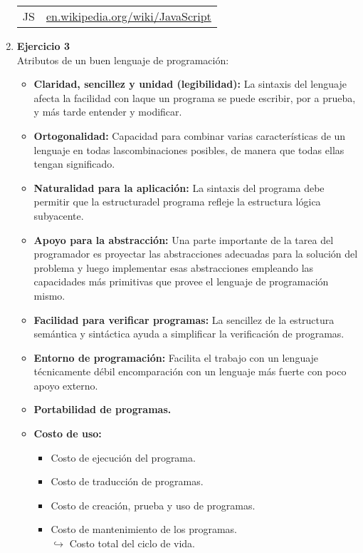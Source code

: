 \documentclass[a4paper,10pt]{article}
\begin{document}
\begin{enumerate}
\begin{tabular}{r|l}
            \textsc{JS}
                & \href{https://en.wikipedia.org/wiki/JavaScript}{en.wikipedia.org/wiki/JavaScript} \\ 
        \end{tabular}
    
        \item \textbf{Ejercicio 3} \\ 
        Atributos de un buen lenguaje de programación:
            \begin{itemize}
                \item \textbf{Claridad, sencillez y unidad (legibilidad):} La sintaxis del lenguaje afecta la facilidad con laque un programa se puede escribir, por a prueba, y más tarde entender y modificar.
                \item \textbf{Ortogonalidad:} Capacidad para combinar varias características de un lenguaje en todas lascombinaciones posibles, de manera que todas ellas tengan significado.
                \item \textbf{Naturalidad para la aplicación:} La sintaxis del programa debe permitir que la estructuradel programa refleje la estructura lógica subyacente.
                \item \textbf{Apoyo para la abstracción:} Una parte importante de la tarea del programador es proyectar las abstracciones adecuadas para la solución del problema y luego implementar esas abstracciones empleando las capacidades más primitivas que provee el lenguaje de programación mismo.
                \item \textbf{Facilidad para verificar programas:} La sencillez de la estructura semántica y sintáctica ayuda a simplificar la verificación de programas.
                \item \textbf{Entorno de programación:} Facilita el trabajo con un lenguaje técnicamente débil encomparación con un lenguaje más fuerte con poco apoyo externo.
                \item \textbf{Portabilidad de programas.}
                \item \textbf{Costo de uso:} 
                    \begin{itemize}
                        \item Costo de ejecución del programa.
                        \item Costo de traducción de programas.
                        \item Costo de creación, prueba y uso de programas.
                        \item Costo de mantenimiento de los programas. \\
                        $\hookrightarrow{}$ Costo total del ciclo de vida.
                    \end{itemize} 
            \end{itemize}
    

\end{enumerate}
\end{document}

